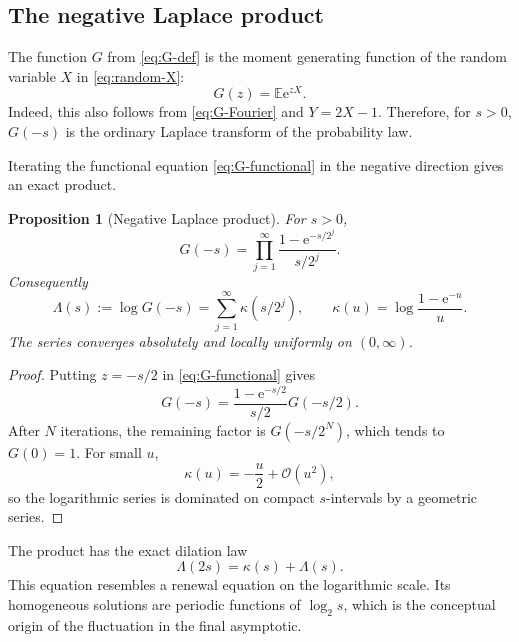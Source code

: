 \documentclass[11pt,oneside]{article}
\newtheorem{proposition}[theorem]{Proposition}
\theoremstyle{definition}
\theoremstyle{remark}
\newcommand{\e}{\mathrm e}
\newcommand{\E}{\mathbb E}
\newcommand{\bigO}{\mathcal O}
\begin{document}
\subsection{The negative Laplace product}

The function $G$ from \eqref{eq:G-def} is the moment generating function of the random
variable $X$ in \eqref{eq:random-X}:
\begin{equation}
 G(z)=\E\e^{zX}.                                           \label{eq:G-mgf}
\end{equation}
Indeed, this also follows from \eqref{eq:G-Fourier} and $Y=2X-1$.  Therefore, for $s>0$,
$G(-s)$ is the ordinary Laplace transform of the probability law.

Iterating the functional equation \eqref{eq:G-functional} in the negative direction gives
an exact product.

\begin{proposition}[Negative Laplace product]
For $s>0$,
\begin{equation}
 G(-s)=\prod_{j=1}^{\infty}
 \frac{1-\e^{-s/2^j}}{s/2^j}.                              \label{eq:negative-Laplace-product}
\end{equation}
Consequently
\begin{equation}
 \Lambda(s):=\log G(-s)
 =\sum_{j=1}^{\infty}\kappa(s/2^j),
 \qquad
 \kappa(u)=\log\frac{1-\e^{-u}}u.                         \label{eq:Lambda-series}
\end{equation}
The series converges absolutely and locally uniformly on $(0,\infty)$.
\end{proposition}

\begin{proof}
Putting $z=-s/2$ in \eqref{eq:G-functional} gives
\begin{equation*}
 G(-s)=\frac{1-\e^{-s/2}}{s/2}G(-s/2).
\end{equation*}
After $N$ iterations, the remaining factor is $G(-s/2^N)$, which tends to $G(0)=1$.
For small $u$,
\begin{equation*}
 \kappa(u)=-\frac u2+\bigO(u^2),
\end{equation*}
so the logarithmic series is dominated on compact $s$-intervals by a geometric series.
\end{proof}

The product has the exact dilation law
\begin{equation}
 \Lambda(2s)=\kappa(s)+\Lambda(s).                         \label{eq:Lambda-dilation}
\end{equation}
This equation resembles a renewal equation on the logarithmic scale.  Its homogeneous
solutions are periodic functions of $\log_2s$, which is the conceptual origin of the
fluctuation in the final asymptotic.
\end{document}
